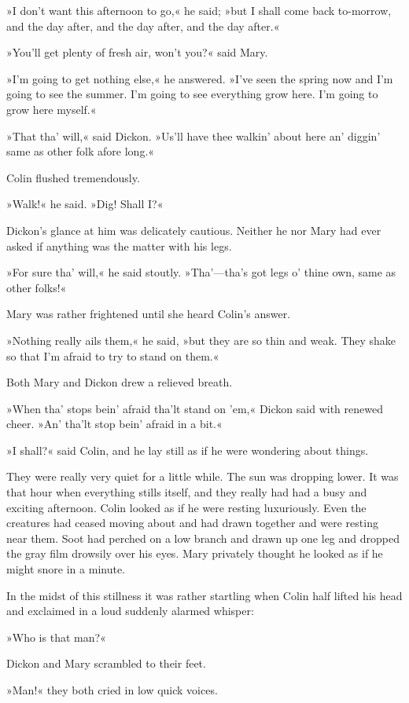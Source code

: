 »I don't want this afternoon to go,« he said; »but I shall come back to-morrow, and the day after, and the day after, and the day after.«

»You'll get plenty of fresh air, won't you?« said Mary.

»I'm going to get nothing else,« he answered. »I've seen the spring now and I'm going to see the summer. I'm going to see everything grow here. I'm going to grow here myself.«

»That tha' will,« said Dickon. »Us'll have thee walkin' about here an' diggin' same as other folk afore long.«

Colin flushed tremendously.

»Walk!« he said. »Dig! Shall I?«

Dickon's glance at him was delicately cautious. Neither he nor Mary had ever asked if anything was the matter with his legs.

»For sure tha' will,« he said stoutly. »Tha'—tha's got legs o' thine own, same as other folks!«

Mary was rather frightened until she heard Colin's answer.

»Nothing really ails them,« he said, »but they are so thin and weak. They shake so that I'm afraid to try to stand on them.«

Both Mary and Dickon drew a relieved breath.

»When tha' stops bein' afraid tha'lt stand on 'em,« Dickon said with renewed cheer. »An' tha'lt stop bein' afraid in a bit.«

»I shall?« said Colin, and he lay still as if he were wondering about things.

They were really very quiet for a little while. The sun was dropping lower. It was that hour when everything stills itself, and they really had had a busy and exciting afternoon. Colin looked as if he were resting luxuriously. Even the creatures had ceased moving about and had drawn together and were resting near them. Soot had perched on a low branch and drawn up one leg and dropped the gray film drowsily over his eyes. Mary privately thought he looked as if he might snore in a minute.

In the midst of this stillness it was rather startling when Colin half lifted his head and exclaimed in a loud suddenly alarmed whisper:

»Who is that man?«

Dickon and Mary scrambled to their feet.

»Man!« they both cried in low quick voices.

